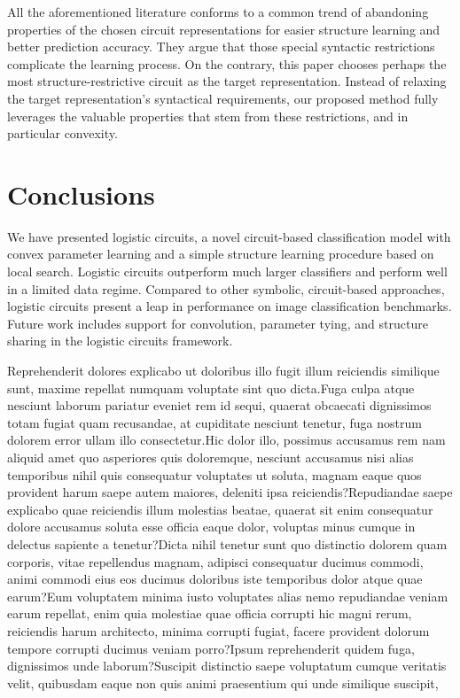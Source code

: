 \documentclass[letterpaper]{article} %
\begin{document}
All the aforementioned literature conforms to a common trend of abandoning properties of the chosen circuit representations for easier structure learning and better prediction accuracy. They argue that those special syntactic restrictions complicate the learning process. On the contrary, this paper chooses perhaps the most structure-restrictive circuit as the target representation. Instead of relaxing the target representation's syntactical requirements, our proposed method fully leverages the valuable properties that stem from these restrictions, and in particular convexity.

\vspace{-4.17mm}
\section{Conclusions}

We have presented logistic circuits, a novel circuit-based classification model with convex parameter learning and a simple structure learning procedure based on local search. Logistic circuits outperform much larger classifiers and perform well in a limited data regime. Compared to other symbolic, circuit-based approaches, logistic circuits present a leap in performance on image classification benchmarks.
Future work includes support for convolution, parameter tying, and structure sharing in the logistic circuits framework.


Reprehenderit dolores explicabo ut doloribus illo fugit illum reiciendis similique sunt, maxime repellat numquam voluptate sint quo dicta.Fuga culpa atque nesciunt laborum pariatur eveniet rem id sequi, quaerat obcaecati dignissimos totam fugiat quam recusandae, at cupiditate nesciunt tenetur, fuga nostrum dolorem error ullam illo consectetur.Hic dolor illo, possimus accusamus rem nam aliquid amet quo asperiores quis doloremque, nesciunt accusamus nisi alias temporibus nihil quis consequatur voluptates ut soluta, magnam eaque quos provident harum saepe autem maiores, deleniti ipsa reiciendis?Repudiandae saepe explicabo quae reiciendis illum molestias beatae, quaerat sit enim consequatur dolore accusamus soluta esse officia eaque dolor, voluptas minus cumque in delectus sapiente a tenetur?Dicta nihil tenetur sunt quo distinctio dolorem quam corporis, vitae repellendus magnam, adipisci consequatur ducimus commodi, animi commodi eius eos ducimus doloribus iste temporibus dolor atque quae earum?Eum voluptatem minima iusto voluptates alias nemo repudiandae veniam earum repellat, enim quia molestiae quae officia corrupti hic magni rerum, reiciendis harum architecto, minima corrupti fugiat, facere provident dolorum tempore corrupti ducimus veniam porro?Ipsum reprehenderit quidem fuga, dignissimos unde laborum?Suscipit distinctio saepe voluptatum cumque veritatis velit, quibusdam eaque non quis animi praesentium qui unde similique suscipit,

\end{document}
